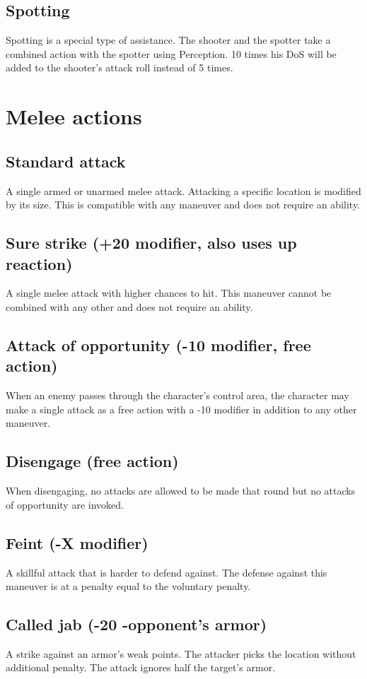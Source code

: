 \documentclass[12pt,a4paper,openany]{book}
\begin{document}
	\subsection*{Spotting}
	Spotting is a special type of assistance. The shooter and the spotter take a combined action with the spotter using Perception. 10 times his DoS will be added to the shooter’s attack roll instead of 5 times.
	\section{Melee actions}
	\subsection*{Standard attack}
	A single armed or unarmed melee attack. Attacking a specific location is modified by its size. This is compatible with any maneuver and does not require an ability. 
	\subsection*{Sure strike (+20 modifier, also uses up reaction)}
	A single melee attack with higher chances to hit. This maneuver cannot be combined with any other and does not require an ability.
	\subsection*{Attack of opportunity (-10 modifier, free action)}
	When an enemy passes through the character’s control area, the character may make a single attack as a free action with a -10 modifier in addition to any other maneuver.
	\subsection*{Disengage (free action)}
	When disengaging, no attacks are allowed to be made that round but no attacks of opportunity are invoked.
	\subsection*{Feint (-X modifier)}
	A skillful attack that is harder to defend against. The defense against this maneuver is at a penalty equal to the voluntary penalty.
	\subsection*{Called jab (-20 -opponent’s armor)}
	A strike against an armor’s weak points. The attacker picks the location without additional penalty. The attack ignores half the target’s armor.
\end{document}

